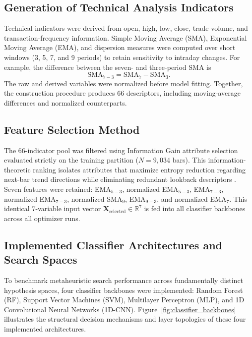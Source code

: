 \subsection{Generation of Technical Analysis Indicators}
\label{sec:indicators}

Technical indicators were derived from open, high, low, close, trade volume, and transaction-frequency information. Simple Moving Average (SMA), Exponential Moving Average (EMA), and dispersion measures were computed over short windows (3, 5, 7, and 9 periods) to retain sensitivity to intraday changes. For example, the difference between the seven- and three-period SMA is
\begin{equation}
\mathrm{SMA}_{7-3}=\mathrm{SMA}_{7}-\mathrm{SMA}_{3}.
\end{equation}
The raw and derived variables were normalized before model fitting. Together, the construction procedure produces 66 descriptors, including moving-average differences and normalized counterparts.

\subsection{Feature Selection Method}
\label{sec:featureselection}

The 66-indicator pool was filtered using Information Gain attribute selection evaluated strictly on the training partition ($N = 9{,}034$ bars). This information-theoretic ranking isolates attributes that maximize entropy reduction regarding next-bar trend directions while eliminating redundant lookback descriptors \cite{lei2012feature,kumar2014feature}. Seven features were retained: EMA$_{5-3}$, normalized EMA$_{5-3}$, EMA$_{7-3}$, normalized EMA$_{7-3}$, normalized SMA$_9$, EMA$_{9-3}$, and normalized EMA$_7$. This identical 7-variable input vector $\mathbf{X}_{\text{selected}} \in \mathbb{R}^7$ is fed into all classifier backbones across all optimizer runs.

\subsection{Implemented Classifier Architectures and Search Spaces}
\label{sec:classifier_architectures}

To benchmark metaheuristic search performance across fundamentally distinct hypothesis spaces, four classifier backbones were implemented: Random Forest (RF), Support Vector Machines (SVM), Multilayer Perceptron (MLP), and 1D Convolutional Neural Networks (1D-CNN). Figure~\ref{fig:classifier_backbones} illustrates the structural decision mechanisms and layer topologies of these four implemented architectures.

